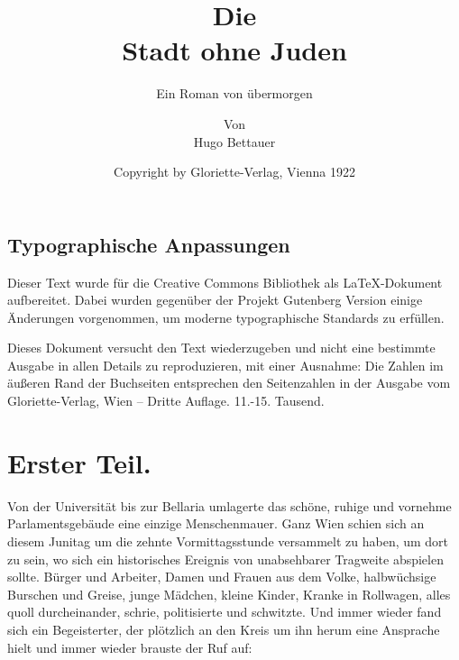 \section{Typographische Anpassungen}
Dieser Text wurde für die Creative Commons Bibliothek als 
\LaTeX-Dokument aufbereitet. Dabei wurden gegenüber der 
Projekt Gutenberg Version einige Änderungen vorgenommen, um moderne
typographische Standards zu erfüllen.

Dieses Dokument versucht den Text wiederzugeben und nicht eine bestimmte
Ausgabe in allen Details zu reproduzieren, mit einer Ausnahme: Die
Zahlen im äußeren Rand der Buchseiten entsprechen den Seitenzahlen
in der Ausgabe vom Gloriette-Verlag, Wien -- Dritte Auflage. 11.-15. Tausend.

\title{Die\\Stadt ohne Juden}

\subtitle{Ein Roman von übermorgen}

\author{Von\\Hugo Bettauer}



\date{Copyright by Gloriette-Verlag, Vienna 1922}



\maketitle

\chapter{Erster Teil.}

Von der Universität bis zur Bellaria umlagerte das schöne, ruhige
und vornehme Parlamentsgebäude eine einzige Menschenmauer. Ganz
Wien schien sich an diesem Junitag um die zehnte Vormittagsstunde
versammelt zu haben, um dort zu sein, wo sich ein historisches
Ereignis von unabsehbarer Tragweite abspielen sollte. Bürger und
Arbeiter, Damen und Frauen aus dem Volke, halbwüchsige Burschen und
Greise, junge Mädchen, kleine Kinder, Kranke in Rollwagen, alles
quoll durcheinander, schrie, politisierte und schwitzte. Und immer
wieder fand sich ein Begeisterter, der plötzlich an den Kreis um
ihn herum eine Ansprache hielt und immer wieder brauste der Ruf
auf:

